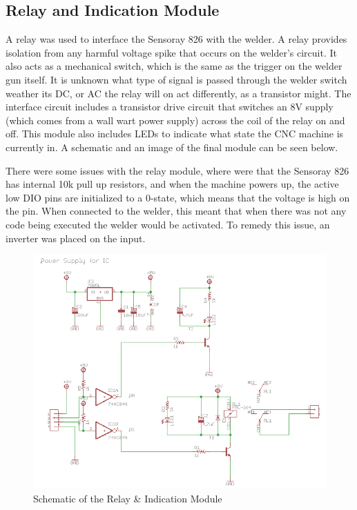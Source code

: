 \documentclass[12pt]{article}
\newlength\tindent
\renewcommand{\indent}{\hspace*{\tindent}}
\begin{document}
\clearpage

\subsection{Relay and Indication Module}

\indent A relay was used to interface the Sensoray 826 with the welder. A relay provides isolation from any harmful voltage spike that occurs on the welder’s circuit. It also acts as a mechanical switch, which is the same as the trigger on the welder gun itself. It is unknown what type of signal is passed through the welder switch weather its DC, or AC the relay will on act differently, as a transistor might. The interface circuit includes a transistor drive circuit that switches an 8V supply (which comes from a wall wart power supply) across the coil of the relay on and off. This module also includes LEDs to indicate what state the CNC machine is currently in. A schematic and an image of the final module can be seen below.

\indent There were some issues with the relay module, where were that the Sensoray 826 has internal 10k pull up resistors, and when the machine powers up, the active low DIO pins are initialized to a 0-state, which means that the voltage is high on the pin. When connected to the welder, this meant that when there was not any code being executed the welder would be activated. To remedy this issue, an inverter was placed on the input.\\


\begin{figure}[!h]
\centering
\includegraphics[scale=0.8]{relay11}
\caption{Schematic of the Relay \& Indication Module}
\end{figure}
\end{document}
